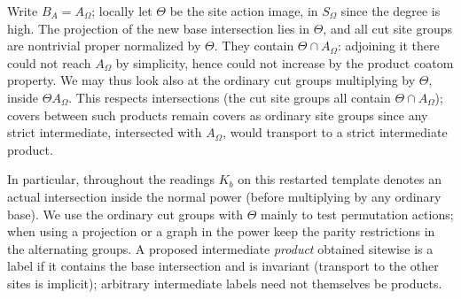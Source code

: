 \begin{convention}\label{t:weighted-site-convention}
Write \(B_A=A_\Omega\); locally let \(\Theta\) be the site action image, in \(S_\Omega\) since the
degree is high. The projection of the new base intersection lies in \(\Theta\), and all cut site
groups are nontrivial proper normalized by \(\Theta\). They contain \(\Theta\cap A_\Omega\):
adjoining it there could not reach \(A_\Omega\) by simplicity, hence could not increase by the
product coatom property. We may thus look also at the ordinary cut groups multiplying by
\(\Theta\), inside \(\Theta A_\Omega\). This respects intersections (the cut site groups all
contain \(\Theta\cap A_\Omega\)); covers between such products remain covers as ordinary site
groups since any strict intermediate, intersected with \(A_\Omega\), would transport to a strict
intermediate product.

In particular, throughout the readings \(K_b\) on this restarted template denotes an actual
intersection inside the normal power (before multiplying by any ordinary base). We use the
ordinary cut groups with \(\Theta\) mainly to test permutation actions; when using a projection or
a graph in the power keep the parity restrictions in the alternating groups. A proposed
intermediate \emph{product} obtained sitewise is a label if it contains the base intersection and
is invariant (transport to the other sites is implicit); arbitrary intermediate labels need not
themselves be products.
\end{convention}

